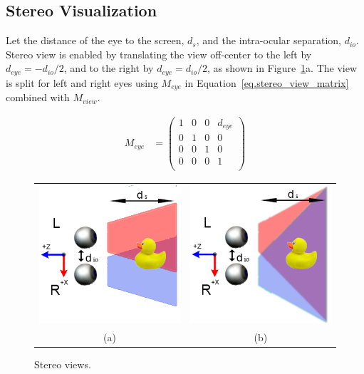\subsection{Stereo Visualization}
\label{sec.stereo_visualization}

Let the distance of the eye to the screen, $d_{s}$, and the intra-ocular separation, $d_{io}$. Stereo view is enabled by translating the view off-center to the left by $d_{eye} = -d_{io}/2$,  and to the right by $d_{eye} = d_{io}/2$, as shown in Figure~\ref{fig.stereo_views}a. The view is split for left and right eyes using $M_{eye}$ in Equation~\ref{eq.stereo_view_matrix} combined with $M_{view}$.

\begin{equation}
\begin{aligned}
M_{eye} &= 
\begin{pmatrix} 
1 & 0 & 0 & d_{eye}\\
0 & 1 & 0 & 0\\
0 & 0 & 1 & 0\\
0 & 0 & 0 & 1\\
\end{pmatrix}
\end{aligned}
\label{eq.stereo_view_matrix}
\end{equation}

\begin{figure}[!hb]
\centering
\begin{tabular}{cc}
\includegraphics[width=0.35\linewidth,keepaspectratio=true]{figs/stereo_offset.png}
&
\includegraphics[width=0.35\linewidth,keepaspectratio=true]{figs/stereo_shear.png}
\\
(a)&(b)
\end{tabular}
\caption{Stereo views.}
\label{fig.stereo_views}
\end{figure}


